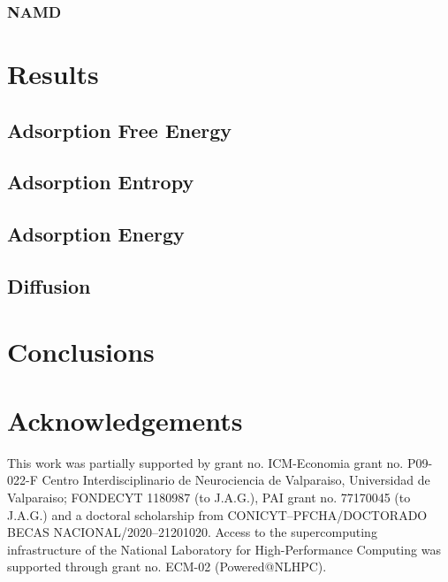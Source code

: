 \documentclass[twoside,twocolumn,9pt]{article}
\begin{document}
\subsubsection{NAMD}






\section{Results}

\subsection{Adsorption Free Energy}

\subsection{Adsorption Entropy}

\subsection{Adsorption Energy}

\subsection{Diffusion}

\section{Conclusions}


\section*{Acknowledgements}
This work was partially supported by grant no. ICM-Economia grant
no. P09-022-F Centro Interdisciplinario de Neurociencia de Valparaiso,
Universidad de Valparaiso; FONDECYT 1180987 (to J.A.G.), PAI grant
no. 77170045 (to J.A.G.) and a doctoral scholarship from
CONICYT--PFCHA/DOCTORADO BECAS NACIONAL/2020--21201020.  Access to the
supercomputing infrastructure of the National Laboratory for
High-Performance Computing was supported through grant no. ECM-02
(Powered@NLHPC).




\end{document}
